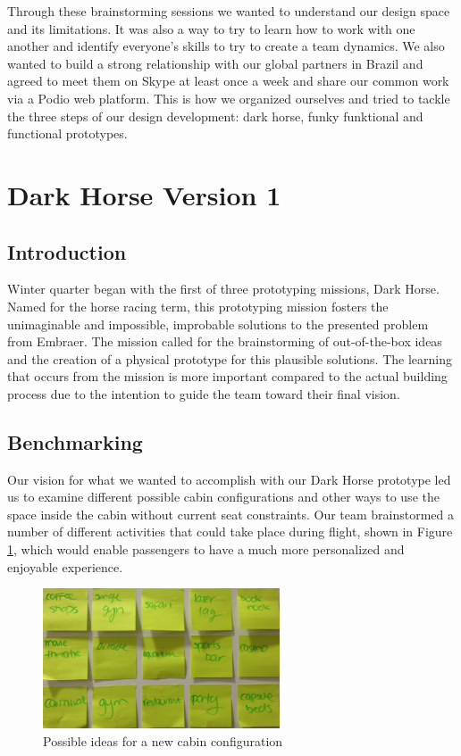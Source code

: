 Through these brainstorming sessions we wanted to understand our design space and its limitations. It was also a way to try to learn how to work with one another and identify everyone's skills to try to create a team dynamics. We also wanted to build a strong relationship with our global partners in Brazil and agreed to meet them on Skype at least once a week and share our common work via a Podio web platform. This is how we organized ourselves and tried to tackle the three steps of our design development: dark horse, funky funktional and functional prototypes. 

\section{Dark Horse Version 1}
\subsection{Introduction}
Winter quarter began with the first of three prototyping missions, Dark Horse.  Named for the horse racing term, this prototyping mission fosters the unimaginable and impossible, improbable solutions to the presented problem from Embraer.  The mission called for the brainstorming of out-of-the-box ideas and the  creation of a physical prototype for this plausible solutions.  The learning that occurs from the mission is more important compared to the actual building process due to the intention to guide the team toward their final vision. 

\subsection{Benchmarking}
Our vision for what we wanted to accomplish with our Dark Horse prototype led us to examine different possible cabin configurations and other ways to use the space inside the cabin without current seat constraints. Our team brainstormed a number of different activities that could take place during flight, shown in Figure \ref{fig:possible_themes.jpg}, which would enable passengers to have a much more personalized and enjoyable experience. 

\begin{figure}[h]
  \centering
     \includegraphics[width=7cm]{images/possible_themes.jpg}
   \caption{Possible ideas for a new cabin configuration}
  \label{fig:possible_themes.jpg}
\end{figure}

